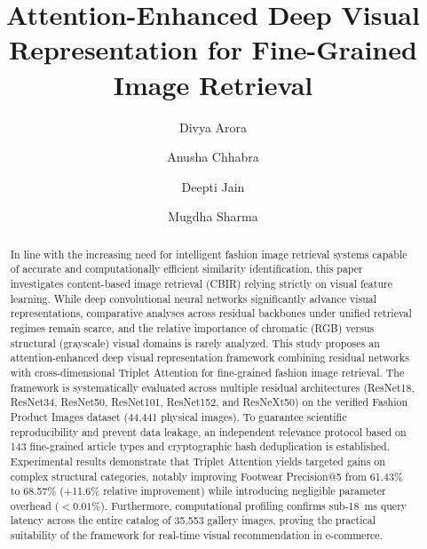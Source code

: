 \documentclass[runningheads]{llncs}
\begin{document}
\title{Attention-Enhanced Deep Visual Representation for Fine-Grained Image Retrieval}

\author{Divya Arora \and
Anusha Chhabra \and
Deepti Jain \and
Mugdha Sharma}



\maketitle

\begin{abstract}
In line with the increasing need for intelligent fashion image retrieval systems capable of accurate and computationally efficient similarity identification, this paper investigates content-based image retrieval (CBIR) relying strictly on visual feature learning. While deep convolutional neural networks significantly advance visual representations, comparative analyses across residual backbones under unified retrieval regimes remain scarce, and the relative importance of chromatic (RGB) versus structural (grayscale) visual domains is rarely analyzed. This study proposes an attention-enhanced deep visual representation framework combining residual networks with cross-dimensional Triplet Attention for fine-grained fashion image retrieval. The framework is systematically evaluated across multiple residual architectures (ResNet18, ResNet34, ResNet50, ResNet101, ResNet152, and ResNeXt50) on the verified Fashion Product Images dataset (44,441 physical images). To guarantee scientific reproducibility and prevent data leakage, an independent relevance protocol based on 143 fine-grained article types and cryptographic hash deduplication is established. Experimental results demonstrate that Triplet Attention yields targeted gains on complex structural categories, notably improving Footwear Precision@5 from 61.43\% to 68.57\% (+11.6\% relative improvement) while introducing negligible parameter overhead ($<0.01\%$). Furthermore, computational profiling confirms sub-18~ms query latency across the entire catalog of 35,553 gallery images, proving the practical suitability of the framework for real-time visual recommendation in e-commerce.

\end{abstract}
\end{document}
